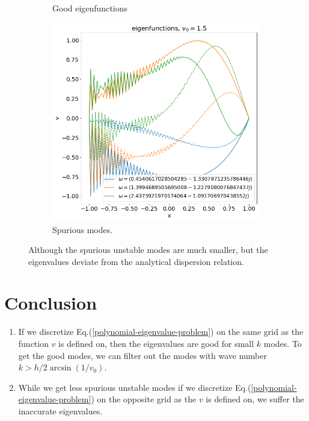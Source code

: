 \begin{figure}[H]
\begin{subfigure}[b]{0.3\linewidth}
		\caption{Good eigenfunctions}
		\label{fig:results-H-b}
	\end{subfigure}
	\begin{subfigure}[b]{0.3\linewidth}
		\includegraphics[width=\linewidth]{img/eigfuncs-bad-H.png}
		\caption{Spurious modes.} 
		\label{fig:results-H-c}  
	\end{subfigure}
	\caption{Although the spurious unstable modes are much smaller, but the eigenvalues deviate from the analytical dispersion relation.}
	\label{fig:results-H}
\end{figure}

\section{Conclusion}
\begin{enumerate}
	\item If we discretize Eq.(\ref{polynomial-eigenvalue-problem}) on the same grid as the function $v$ is defined on, then the eigenvalues are good for small $k$ modes. To get the good modes, we can filter out the modes with wave number $k>h/2\arcsin(1/v_0)$.
	\item While we get less spurious unstable modes if we discretize Eq.(\ref{polynomial-eigenvalue-problem}) on the opposite grid as the $v$ is defined on, we suffer the inaccurate eigenvalues.
\end{enumerate}